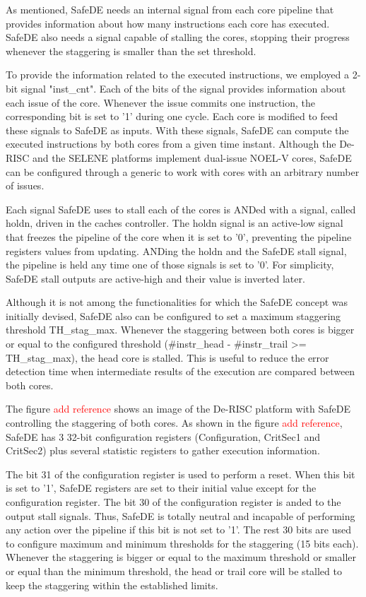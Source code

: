 As mentioned, SafeDE needs an internal signal from each core pipeline that provides information about how many instructions each core has executed. SafeDE also needs a signal capable of stalling the cores, stopping their progress whenever the staggering is smaller than the set threshold. 

To provide the information related to the executed instructions, we employed a 2-bit signal "inst\_cnt". Each of the bits of the signal provides information about each issue of the core. Whenever the issue commits one instruction, the corresponding bit is set to '1' during one cycle. Each core is modified to feed these signals to SafeDE as inputs. With these signals, SafeDE can compute the executed instructions by both cores from a given time instant. Although the De-RISC and the SELENE platforms implement dual-issue NOEL-V cores, SafeDE can be configured through a generic to work with cores with an arbitrary number of issues. 

Each signal SafeDE uses to stall each of the cores is ANDed with a signal, called holdn, driven in the caches controller. The holdn signal is an active-low signal that freezes the pipeline of the core when it is set to '0', preventing the pipeline registers values from updating. ANDing the holdn and the SafeDE stall signal, the pipeline is held any time one of those signals is set to '0'. For simplicity, SafeDE stall outputs are active-high and their value is inverted later. 

Although it is not among the functionalities for which the SafeDE concept was initially devised, SafeDE also can be configured to set a maximum staggering threshold TH\_stag\_max. Whenever the staggering between both cores is bigger or equal to the configured threshold (\#instr\_head - \#instr\_trail >= TH\_stag\_max), the head core is stalled. This is useful to reduce the error detection time when intermediate results of the execution are compared between both cores.

The figure \textcolor{red}{add reference} shows an image of the De-RISC platform with SafeDE controlling the staggering of both cores. As shown in the figure \textcolor{red}{add reference}, SafeDE has 3 32-bit configuration registers (Configuration, CritSec1 and CritSec2) plus several statistic registers to gather execution information.

The bit 31 of the configuration register is used to perform a reset. When this bit is set to '1', SafeDE registers are set to their initial value except for the configuration register. The bit 30 of the configuration register is anded to the output stall signals. Thus, SafeDE is totally neutral and incapable of performing any action over the pipeline if this bit is not set to '1'. The rest 30 bits are used to configure maximum and minimum thresholds for the staggering (15 bits each). Whenever the staggering is bigger or equal to the maximum threshold or smaller or equal than the minimum threshold, the head or trail core will be stalled to keep the staggering within the established limits.  

